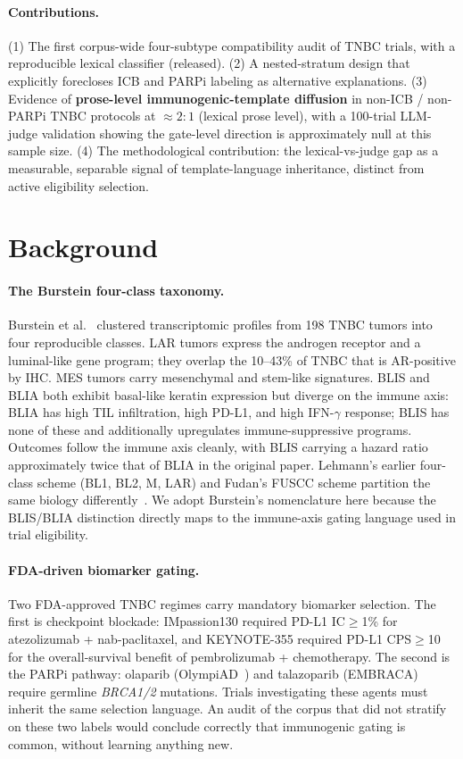 \documentclass{article}
\begin{document}
\paragraph{Contributions.}
(1) The first corpus-wide four-subtype compatibility audit of TNBC
trials, with a reproducible lexical classifier (released).
(2) A nested-stratum design that explicitly forecloses ICB and PARPi
labeling as alternative explanations.
(3) Evidence of \textbf{prose-level immunogenic-template diffusion}
in non-ICB / non-PARPi TNBC protocols at $\approx 2:1$ (lexical
prose level), with a 100-trial LLM-judge validation showing the
gate-level direction is approximately null at this sample size.
(4) The methodological contribution: the lexical-vs-judge gap as a
measurable, separable signal of template-language inheritance,
distinct from active eligibility selection.

\section{Background}
\label{sec:background}

\paragraph{The Burstein four-class taxonomy.}
Burstein et al.~\cite{burstein2015} clustered transcriptomic profiles
from 198 TNBC tumors into four reproducible classes.  LAR tumors
express the androgen receptor and a luminal-like gene program; they
overlap the 10--43\% of TNBC that is AR-positive by IHC.  MES tumors
carry mesenchymal and stem-like signatures.  BLIS and BLIA both
exhibit basal-like keratin expression but diverge on the immune axis:
BLIA has high TIL infiltration, high PD-L1, and high IFN-$\gamma$
response; BLIS has none of these and additionally upregulates
immune-suppressive programs.  Outcomes follow the immune axis cleanly,
with BLIS carrying a hazard ratio approximately twice that of BLIA in
the original paper.  Lehmann's earlier four-class scheme (BL1, BL2, M,
LAR) and Fudan's FUSCC scheme partition the same biology
differently~\cite{hossain2021}.  We adopt Burstein's nomenclature here
because the BLIS/BLIA distinction directly maps to the immune-axis
gating language used in trial eligibility.

\paragraph{FDA-driven biomarker gating.}
Two FDA-approved TNBC regimes carry mandatory biomarker selection.
The first is checkpoint blockade: IMpassion130 \cite{schmid2018}
required PD-L1 IC$\geq$1\% for atezolizumab + nab-paclitaxel, and
KEYNOTE-355 \cite{cortes2020} required PD-L1 CPS$\geq$10 for the
overall-survival benefit of pembrolizumab + chemotherapy.  The second
is the PARPi pathway: olaparib (OlympiAD~\cite{robson2017}) and
talazoparib (EMBRACA) require germline \emph{BRCA1/2} mutations.
Trials investigating these agents must inherit the same selection
language.  An audit of the corpus that did not stratify on these two
labels would conclude correctly that immunogenic gating is common,
without learning anything new.
\end{document}
